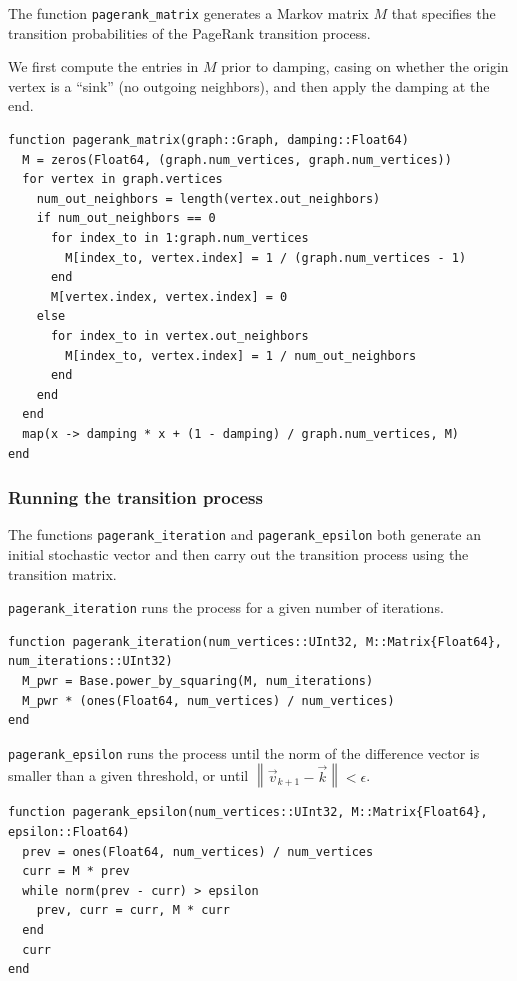 \documentclass[12pt, titlepage, twoside]{amsart}
\begin{document}
The function \texttt{pagerank_matrix} generates a Markov matrix $M$ that specifies the transition
probabilities of the PageRank transition process.

We first compute the entries in $M$ prior to damping, casing on whether the origin vertex is a ``sink''
(no outgoing neighbors), and then apply the damping at the end.

\begin{verbatim}
function pagerank_matrix(graph::Graph, damping::Float64)
  M = zeros(Float64, (graph.num_vertices, graph.num_vertices))
  for vertex in graph.vertices
    num_out_neighbors = length(vertex.out_neighbors)
    if num_out_neighbors == 0
      for index_to in 1:graph.num_vertices
        M[index_to, vertex.index] = 1 / (graph.num_vertices - 1)
      end
      M[vertex.index, vertex.index] = 0
    else
      for index_to in vertex.out_neighbors
        M[index_to, vertex.index] = 1 / num_out_neighbors
      end
    end
  end
  map(x -> damping * x + (1 - damping) / graph.num_vertices, M)
end
\end{verbatim}

\subsubsection{Running the transition process}

The functions \texttt{pagerank_iteration} and \texttt{pagerank_epsilon} both generate
an initial stochastic vector and then carry out the transition process using the transition matrix.

\texttt{pagerank_iteration} runs the process for a given number of iterations.

\begin{verbatim}
function pagerank_iteration(num_vertices::UInt32, M::Matrix{Float64}, num_iterations::UInt32)
  M_pwr = Base.power_by_squaring(M, num_iterations) 
  M_pwr * (ones(Float64, num_vertices) / num_vertices)
end
\end{verbatim}

\texttt{pagerank_epsilon} runs the process until the norm of the difference vector
is smaller than a given threshold, or until
$\left\lVert\vec{v}_{k + 1} - \vec{k}\right\rVert < \epsilon$.

\begin{verbatim}
function pagerank_epsilon(num_vertices::UInt32, M::Matrix{Float64}, epsilon::Float64)
  prev = ones(Float64, num_vertices) / num_vertices
  curr = M * prev
  while norm(prev - curr) > epsilon
    prev, curr = curr, M * curr
  end
  curr
end
\end{verbatim}
\end{document}
